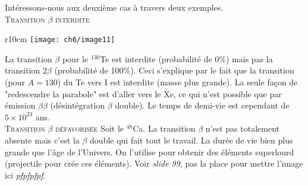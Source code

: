 Intéressons-nous aux deuxième cas à travers deux exemples. \\

\textsc{Transition $\beta$ interdite}\ \\

	\begin{wrapfigure}[12]{r}{10cm}
	\vspace{-8mm}
	\texttt{[image: ch6/image11]}
	\end{wrapfigure}
	
La transition $\beta$ pour le $^130$Te est interdite (probabilité de 0\%) mais pas la transition 
$2\beta$ (probabilité de 100\%). Ceci s'explique par le fait que la transition (pour $A=130$) du Te 
vers I est interdite (masse plus grande). La seule façon de "redescendre la parabole" est d'aller vers 
le Xe, ce qui n'est possible que par émission $\beta\beta$ (désintégration $\beta$ double). Le temps de
demi-vie est cependant de $5\times 10^23$ ans.\\







\textsc{Transition $\beta$ défavorisée}
Soit le $^{48}$Ca. La transition $\beta$ n'est pas totalement absente mais c'est la $\beta$ double qui fait
tout le travail. La durée de vie bien plus grande que l'âge de l'Univers. On l'utilise pour obtenir des éléments
superlourd (projectile pour crée ces éléments). Voir \textit{slide 99}, pas la place pour mettre l'image 
ici \textit{pfpfpfpf}.
























